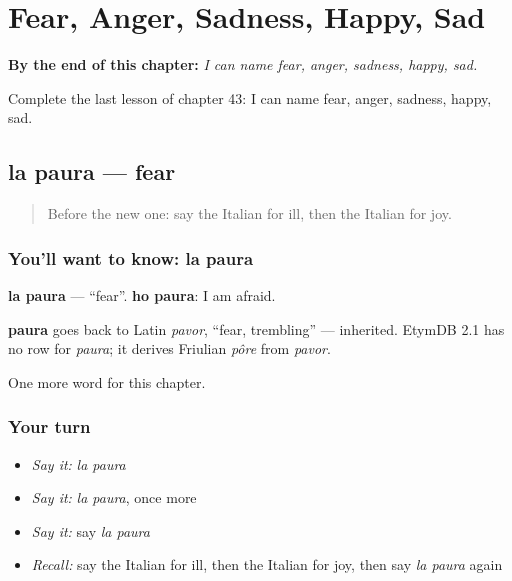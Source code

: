 
\chapter{Fear, Anger, Sadness, Happy, Sad}
\label{ch:it-fear-anger-sadness-happy-sad}

\begin{chapteropening}
\textbf{By the end of this chapter:} \emph{I can name fear, anger, sadness, happy, sad.}

Complete the last lesson of chapter 43: I can name fear, anger, sadness, happy, sad.
\end{chapteropening}

\section[la paura]{la paura — fear}

\label{lesson:IT-C43-paura}



\begin{quote}
Before the new one: say the Italian for ill, then the Italian for joy.
\end{quote}

\subsection*{You'll want to know: la paura}
\textbf{la paura} — \textquotedblleft{}fear\textquotedblright{}. \textbf{ho paura}: I am afraid.

\begin{cousinweb}
\textbf{paura} goes back to Latin \emph{pavor}, \textquotedblleft{}fear, trembling\textquotedblright{} — inherited. EtymDB 2.1 has no row for \emph{paura}; it derives Friulian \emph{pôre} from \emph{pavor}.
\end{cousinweb}

\begin{grammarlens}[title={What you've built}]
One more word for this chapter.
\end{grammarlens}

\subsection*{Your turn}
\begin{itemize}
\raggedright
  \item \emph{Say it:} \emph{la paura}
  \item \emph{Say it:} \emph{la paura}, once more
  \item \emph{Say it:} say \emph{la paura}
  \item \emph{Recall:} say the Italian for ill, then the Italian for joy, then say \emph{la paura} again
\end{itemize}

